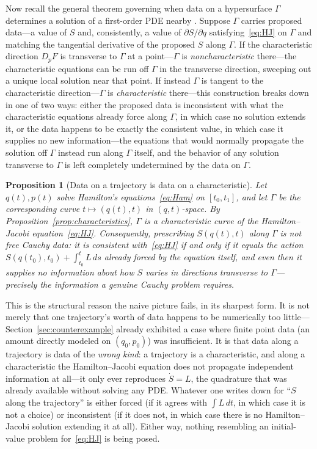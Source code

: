 \documentclass[11pt]{article}
\newtheorem{proposition}{Proposition}[section]
\begin{document}
Now recall the general theorem governing when data on a hypersurface $\Gamma$ determines a solution of a first-order PDE nearby \citep{evans2010,courant-hilbert1962}. Suppose $\Gamma$ carries proposed data---a value of $S$ and, consistently, a value of $\partial S/\partial q$ satisfying~\eqref{eq:HJ} on $\Gamma$ and matching the tangential derivative of the proposed $S$ along $\Gamma$. If the characteristic direction $D_pF$ is transverse to $\Gamma$ at a point---$\Gamma$ is \emph{noncharacteristic} there---the characteristic equations can be run off $\Gamma$ in the transverse direction, sweeping out a unique local solution near that point. If instead $\Gamma$ is tangent to the characteristic direction---$\Gamma$ is \emph{characteristic} there---this construction breaks down in one of two ways: either the proposed data is inconsistent with what the characteristic equations already force along $\Gamma$, in which case no solution extends it, or the data happens to be exactly the consistent value, in which case it supplies no new information---the equations that would normally propagate the solution off $\Gamma$ instead run along $\Gamma$ itself, and the behavior of any solution transverse to $\Gamma$ is left completely undetermined by the data on $\Gamma$.

\begin{proposition}[Data on a trajectory is data on a characteristic]
\label{prop:trajectory-characteristic}
Let $q(t),p(t)$ solve Hamilton's equations~\eqref{eq:Ham} on $[t_0,t_1]$, and let $\Gamma$ be the corresponding curve $t\mapsto(q(t),t)$ in $(q,t)$-space. By Proposition~\ref{prop:characteristics}, $\Gamma$ is a characteristic curve of the Hamilton--Jacobi equation~\eqref{eq:HJ}. Consequently, prescribing $S(q(t),t)$ along $\Gamma$ is not free Cauchy data: it is consistent with~\eqref{eq:HJ} if and only if it equals the action $S(q(t_0),t_0)+\int_{t_0}^t L\,ds$ already forced by the equation itself, and even then it supplies no information about how $S$ varies in directions transverse to $\Gamma$---precisely the information a genuine Cauchy problem requires.
\end{proposition}

This is the structural reason the naive picture fails, in its sharpest form. It is not merely that one trajectory's worth of data happens to be numerically too little---Section~\ref{sec:counterexample} already exhibited a case where finite point data (an amount directly modeled on $(q_0,p_0)$) was insufficient. It is that data along a trajectory is data of the \emph{wrong kind}: a trajectory is a characteristic, and along a characteristic the Hamilton--Jacobi equation does not propagate independent information at all---it only ever reproduces $\dot S=L$, the quadrature that was already available without solving any PDE. Whatever one writes down for ``$S$ along the trajectory'' is either forced (if it agrees with $\int L\,dt$, in which case it is not a choice) or inconsistent (if it does not, in which case there is no Hamilton--Jacobi solution extending it at all). Either way, nothing resembling an initial-value problem for~\eqref{eq:HJ} is being posed.
\end{document}
